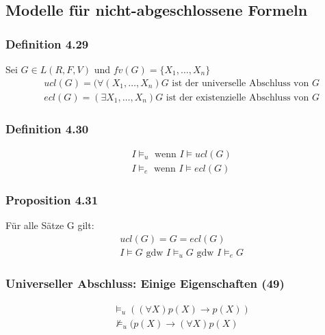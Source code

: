 \subsection{Modelle für nicht-abgeschlossene Formeln}
\subsubsection{Definition 4.29}
Sei \(G \in L(R,F,V) \) und \(fv(G) = \{X_{1}, \ldots , X_{n}\}\)
\begin{align*}
& ucl(G) = (\forall (X_{1}, \ldots , X_{n}) G \text{ ist der universelle Abschluss von } G \\
& ecl(G) = (\exists X_{1}, \ldots , X_{n}) G \text{ ist der existenzielle Abschluss von } G
\end{align*}
\subsubsection{Definition 4.30}
\begin{align*}
& I \vDash _{u} \text{ wenn } I \vDash ucl(G) \\
& I \vDash _{e} \text{ wenn } I \vDash ecl(G) 
\end{align*}
\subsubsection{Proposition 4.31}
Für alle Sätze G gilt:
\begin{align*}
& ucl(G) = G = ecl (G) \\
& I \vDash G \text{ gdw } I \vDash _{u} G \text{ gdw } I \vDash_{e} G
\end{align*}
\subsubsection{Universeller Abschluss: Einige Eigenschaften (49)}
\begin{align*}
&\vDash _{u} ((\forall X)p(X) \to p(X)) \\
&\nvDash _{u} (p(X) \to (\forall X)p(X) 
\end{align*}